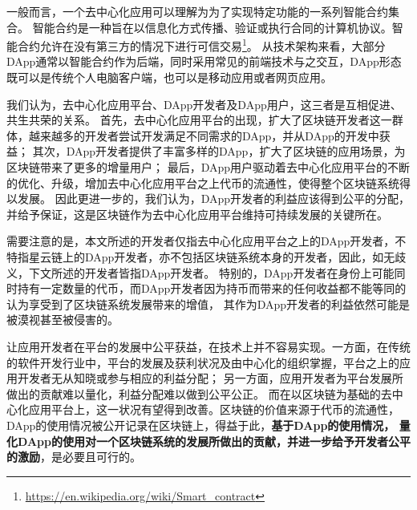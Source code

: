 一般而言，一个去中心化应用可以理解为为了实现特定功能的一系列智能合约集合。
智能合约是一种旨在以信息化方式传播、验证或执行合同的计算机协议。智能合约允许在没有第三方的情况下进行可信交易\footnote{\url{https://en.wikipedia.org/wiki/Smart\_contract}}。
从技术架构来看，大部分DApp通常以智能合约作为后端，同时采用常见的前端技术与之交互，DApp形态既可以是传统个人电脑客户端，也可以是移动应用或者网页应用。

我们认为，去中心化应用平台、DApp开发者及DApp用户，这三者是互相促进、共生共荣的关系。
首先，去中心化应用平台的出现，扩大了区块链开发者这一群体，越来越多的开发者尝试开发满足不同需求的DApp，并从DApp的开发中获益；
其次，DApp开发者提供了丰富多样的DApp，扩大了区块链的应用场景，为区块链带来了更多的增量用户；
最后，DApp用户驱动着去中心化应用平台的不断的优化、升级，增加去中心化应用平台之上代币的流通性，使得整个区块链系统得以发展。
因此更进一步的，我们认为，DApp开发者的利益应该得到公平的分配，并给予保证，这是区块链作为去中心化应用平台维持可持续发展的关键所在。

需要注意的是，本文所述的开发者仅指去中心化应用平台之上的DApp开发者，不特指星云链上的DApp开发者，亦不包括区块链系统本身的开发者，因此，如无歧义，下文所述的开发者皆指DApp开发者。
特别的，DApp开发者在身份上可能同时持有一定数量的代币，而DApp开发者因为持币而带来的任何收益都不能等同的认为享受到了区块链系统发展带来的增值，
其作为DApp开发者的利益依然可能是被漠视甚至被侵害的。


让应用开发者在平台的发展中公平获益，在技术上并不容易实现。一方面，在传统的软件开发行业中，平台的发展及获利状况及由中心化的组织掌握，平台之上的应用开发者无从知晓或参与相应的利益分配；
另一方面，应用开发者为平台发展所做出的贡献难以量化，利益分配难以做到公平公正。
而在以区块链为基础的去中心化应用平台上，这一状况有望得到改善。区块链的价值来源于代币的流通性，DApp的使用情况被公开记录在区块链上，得益于此，\textbf{基于DApp的使用情况，
量化DApp的使用对一个区块链系统的发展所做出的贡献，并进一步给予开发者公平的激励}，是必要且可行的。

